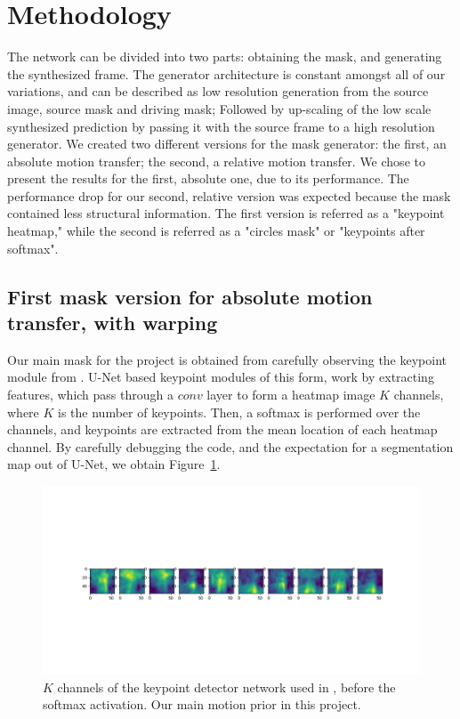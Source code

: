 \documentclass{article}
\begin{document}
\section{Methodology}
The network can be divided into two parts: obtaining the mask, and generating
the synthesized frame. The generator architecture is constant amongst all of
our variations, and can be described as low resolution generation from the
source image, source mask and driving mask; Followed by up-scaling of the
low scale synthesized prediction by passing it with the source frame to a
high resolution generator.
We created two different versions for the mask generator: the first, an
absolute motion transfer; the second,  a relative motion transfer. We chose
to present the results for the first, absolute one, due to its performance.
The performance drop for our second, relative version was expected because the
mask contained less structural information.
The first version is referred as a "keypoint heatmap," while the second is referred as a "circles mask" or "keypoints after softmax".

\subsection{First mask version for absolute motion transfer, with warping}
Our main mask for the project is obtained from carefully observing the
keypoint module from \cite{siarohin2020order}. U-Net based keypoint
modules of this form, work by extracting features, which pass through a
$\textit{conv}$ layer to form a heatmap image $K$ channels, where $K$ is the
number of keypoints. Then, a softmax is performed over the channels, and
keypoints are extracted from the mean location of each heatmap channel.
By carefully debugging the code, and the expectation for a segmentation map
out of U-Net, we obtain Figure~\ref{mask-10kp}.
\begin{figure}[ht]
\vskip 0.2in
\begin{center}
\centerline{\includegraphics[width=\columnwidth]{visualizations/mask_10kp}}
\caption{
$K$ channels of the keypoint detector network used in
\cite{siarohin2020order}, before the softmax activation. Our main motion
prior in this project.
}
\label{mask-10kp}
\end{center}
\vskip -0.2in
\end{figure}
\end{document}

